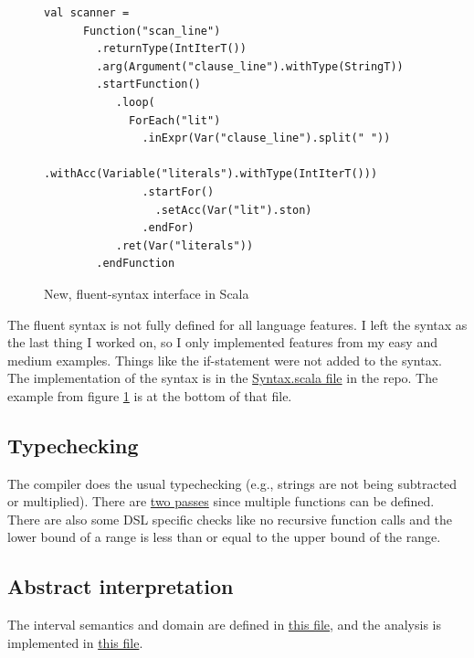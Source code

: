 \documentclass[letterpaper]{article}
\begin{document}
\begin{figure}[h]
    \begin{lstlisting}
val scanner = 
      Function("scan_line")
        .returnType(IntIterT())
        .arg(Argument("clause_line").withType(StringT))
        .startFunction()
           .loop(
             ForEach("lit")
               .inExpr(Var("clause_line").split(" "))
               .withAcc(Variable("literals").withType(IntIterT()))
               .startFor()
                 .setAcc(Var("lit").ston)
               .endFor)
           .ret(Var("literals"))
        .endFunction
    \end{lstlisting}
  \caption{New, fluent-syntax interface in Scala}
    \label{fig:fluentsyntax}
\end{figure}

The fluent syntax is not fully defined for all language features.
I left the syntax as the last thing I worked on, so I only implemented
features from my easy and medium examples. Things like the if-statement
were not added to the syntax. The implementation of the syntax is
in the \href{https://github.com/Flandini/cse501project20au/blob/master/scala-dsl/dsl/src/main/scala/Syntax.scala}
{Syntax.scala file} in the repo. The example from figure \ref{fig:fluentsyntax} is at the bottom of that file.

\subsection{Typechecking}

The compiler does the usual typechecking (e.g., strings are not
being subtracted or multiplied). There are \href{https://github.com/Flandini/cse501project20au/blob/master/scala-dsl/dsl/src/main/scala/TypeCheck.scala#L29}{two passes} since multiple functions can be defined.
There are also some DSL specific checks like no recursive function
calls and the lower bound of a range is less than or equal to
the upper bound of the range. 

\subsection{Abstract interpretation}

The interval semantics and domain are defined in \href{https://github.com/Flandini/cse501project20au/blob/master/scala-dsl/dsl/src/main/scala/Interval.scala#L150}{this file}, and the analysis is implemented in \href{https://github.com/Flandini/cse501project20au/blob/master/scala-dsl/dsl/src/main/scala/SafetyChecks.scala}{this file}. 
\end{document}
